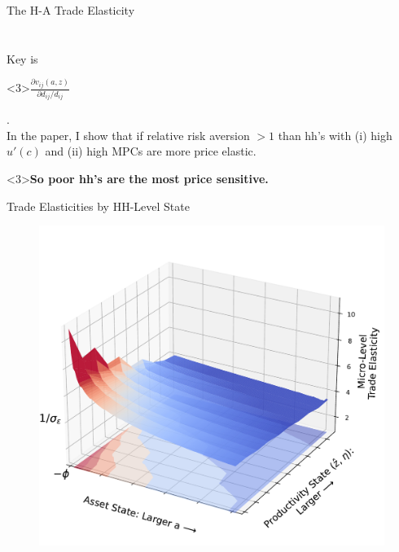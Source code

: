 \documentclass[9pt,pdftex,aspectratio=1610]{beamer}
\theoremstyle{definition}
\begin{document}
\begin{frame}[t]{The H-A Trade Elasticity}
{{\begin{align*}
\end{align*}}\\
Key is \begin{alert}<3>{$\frac{\partial v_{ij}(a,z)}{\partial d_{ij}/d_{ij}}$}\end{alert}.\\
\bigskip
In the paper, I show that if relative risk aversion $ > 1$ than hh's with (i) high $u'(c)$ and (ii) high MPCs are more price elastic. \begin{alert}<3>{\textbf{So poor hh's are the most price sensitive.}}\end{alert}}
\end{frame}






%



\begin{frame}[t]{Trade Elasticities by HH-Level State}
\vspace{-.5cm}
\begin{figure}[t]
\centerline{
\includegraphics[scale = 0.5]{../notes/figures/micro-elasticity.pdf}}
\end{figure}
\end{frame}
\end{document}
